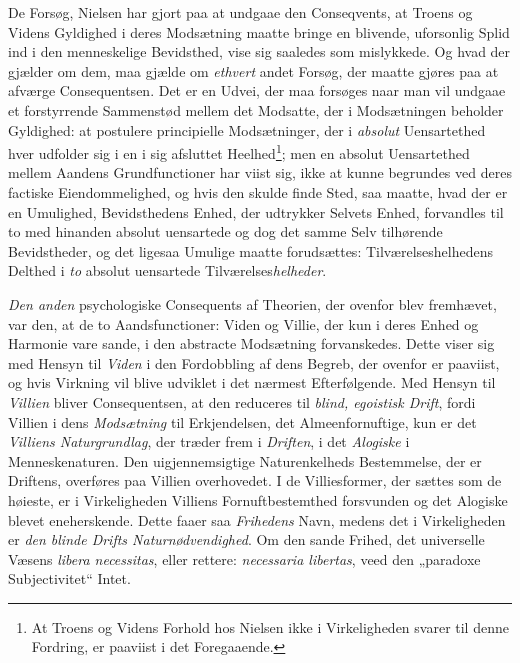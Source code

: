 \documentclass[12pt,a4paper]{book}
\newcommand{\opage}[1]{\marginnote{\footnotesize\textit{[#1]}}}
\begin{document}
De Forsøg, Nielsen har gjort paa at undgaae den Conseqvents, at Troens og Videns Gyldighed i
deres Modsætning maatte bringe en blivende, uforsonlig Splid ind i den menneskelige
Bevidsthed, vise sig saaledes som mislykkede. Og hvad der gjælder om dem, maa gjælde om
\emph{ethvert} andet Forsøg, der maatte gjøres paa at afværge Consequentsen. Det er en Udvei,
der maa forsøges naar man vil undgaae et forstyrrende Sammenstød mellem det Modsatte, der i
Modsætningen beholder Gyldighed: at postulere principielle Modsætninger, der i \emph{absolut} Uensartethed hver udfolder sig i en i sig afsluttet Heelhed\footnote{At Troens og Videns
Forhold hos Nielsen ikke i Virkeligheden svarer til denne Fordring, er paaviist i det
Foregaaende.}; men en absolut Uensartethed mellem Aandens Grundfunctioner har viist sig, ikke
at kunne begrundes ved deres factiske Eiendommelighed, og hvis den skulde finde Sted, saa
maatte, hvad der er en Umulighed, Bevidsthedens Enhed, der udtrykker Selvets Enhed, forvandles
til to med hinanden absolut uensartede og dog det samme Selv tilhørende Bevidstheder, og det
ligesaa Umulige maatte forudsættes: Tilværelseshelhedens Delthed i \emph{to} absolut uensartede
Tilværelses\emph{helheder}.

\emph{Den anden} psychologiske Consequents af Theorien, der ovenfor blev fremhævet, var den, at de to
Aandsfunctioner: Viden og Villie, der kun i deres Enhed og Harmonie vare sande, i den abstracte
Modsætning forvanskedes. Dette viser sig med Hensyn til \emph{Viden} i den Fordobbling af dens Begreb,
der ovenfor er paaviist, og hvis Virkning \opage{194}vil blive udviklet i det nærmest Efterfølgende. Med
Hensyn til \emph{Villien} bliver Consequentsen, at den reduceres til \emph{blind, egoistisk Drift},
fordi Villien i dens \emph{Modsætning} til Erkjendelsen, det Almeenfornuftige, kun er det \emph{Villiens Naturgrundlag}, der træder frem i \emph{Driften}, i det \emph{Alogiske} i Menneskenaturen. Den uigjennemsigtige
Naturenkelheds Bestemmelse, der er Driftens, overføres paa Villien overhovedet. I de
Villiesformer, der sættes som de høieste, er i Virkeligheden Villiens Fornuftbestemthed forsvunden
og det Alogiske blevet eneherskende. Dette faaer saa \emph{Frihedens} Navn, medens det i
Virkeligheden er \emph{den blinde Drifts Naturnødvendighed}. Om den sande Frihed, det universelle
Væsens \textit{libera necessitas}, eller rettere: \textit{necessaria libertas}, veed den
„paradoxe Subjectivitet“ Intet.
\end{document}
